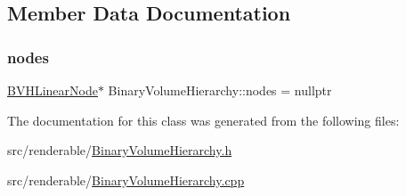 \subsection{Member Data Documentation}
\mbox{\label{classBinaryVolumeHierarchy_abbadac5cecbdedd8df30cd294ff0ed29}} 
\subsubsection{\texorpdfstring{nodes}{nodes}}
{\footnotesize\ttfamily \mbox{\hyperlink{structBVHLinearNode}{B\+V\+H\+Linear\+Node}}$\ast$ Binary\+Volume\+Hierarchy\+::nodes = nullptr\hspace{0.3cm}{\ttfamily [private]}}



The documentation for this class was generated from the following files\+:\begin{DoxyCompactItemize}
\item 
src/renderable/\mbox{\hyperlink{BinaryVolumeHierarchy_8h}{Binary\+Volume\+Hierarchy.\+h}}\item 
src/renderable/\mbox{\hyperlink{BinaryVolumeHierarchy_8cpp}{Binary\+Volume\+Hierarchy.\+cpp}}\end{DoxyCompactItemize}
